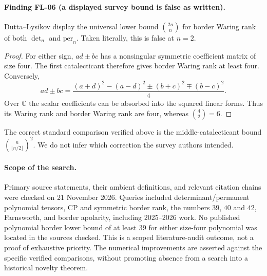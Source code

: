 \paragraph{Finding FL-06 (a displayed survey bound is false as written).}
Dutta--Lysikov \cite[\S4.3, p.~29, immediately after Corollary~56]{DL2025}
display the universal lower bound $\binom{2n}{n}$ for border
Waring rank of both $\det_n$ and $\mathrm{per}_n$. Taken
literally, this is false at $n=2$.

\begin{proof}
For either sign, $ad\pm bc$ has a nonsingular symmetric
coefficient matrix of size four. The first catalecticant
therefore gives border Waring rank at least four. Conversely,
\[
 ad\pm bc=
 \frac{(a+d)^2-(a-d)^2\pm(b+c)^2\mp(b-c)^2}{4}.
\]
Over $\mathbb C$ the scalar coefficients can be absorbed
into the squared linear forms. Thus its Waring rank and
border Waring rank are four, whereas $\binom42=6$.
\end{proof}

The correct standard comparison verified above is the
middle-catalecticant bound
$\binom{n}{\lfloor n/2\rfloor}^2$. We do not infer which
correction the survey authors intended.

\paragraph{Scope of the search.}
Primary source statements, their ambient definitions, and
relevant citation chains were checked on 21 November 2026.
Queries included determinant/permanent polynomial tensors,
CP and symmetric border rank, the numbers $39$, $40$ and $42$,
Farnsworth, and border apolarity, including 2025--2026 work.
No published polynomial border lower bound of at least $39$
for either size-four polynomial was located in the sources
checked. This is a scoped literature-audit outcome, not a
proof of exhaustive priority. The numerical improvements
are asserted against the specific verified comparisons,
without promoting absence from a search into a historical
novelty theorem.
